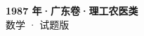 \documentclass[zihao=-4, a4paper]{ctexart}
\begin{document}
\begin{center}
  {\Large\bfseries 1987 年·广东卷·理工农医类}\\[4pt]
  {\large 数学 · 试题版}
\end{center}
\medskip
{}

\end{document}
